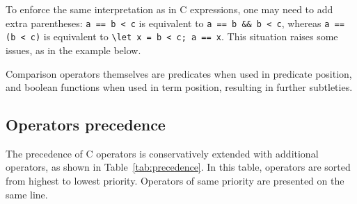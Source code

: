   To enforce the same interpretation as in C expressions, one may need
  to add extra parentheses: \lstinline|a == b < c| is equivalent
  to \lstinline|a == b && b < c|, whereas
  \lstinline |a == (b < c)| is
  equivalent to \lstinline|\let x = b < c; a == x|.
  This situation raises some issues, as in the example below.


Comparison operators themselves are
predicates when used in predicate position, and boolean functions when
used in term position, resulting in further subtleties.
\begin{example}

\end{example}

\subsection{Operators precedence}

The precedence of C operators is conservatively extended with
additional operators, as shown in Table~\ref{tab:precedence}. In this
table, operators are sorted from highest to lowest priority. Operators
of same priority are presented on the same line.

